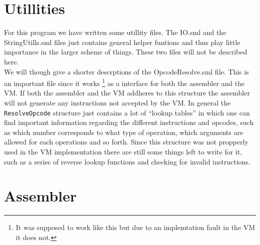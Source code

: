 \documentclass{article}
\newcommand{\V}{\verb}
\begin{document}
\section{Utillities}
For this program we have written some utillity files. The IO.sml and the
StringUtills.sml files just contains general helper funtions and thus play
little importance in the larger scheme of things. These two files will not be
described here.
\\
We will though give a shorter descrptions of the OpcodeResolve.sml file. This is
an important file since it works \footnote{It was supposed to work like this
but due to an implemtation fault in the VM it does not.} as a interface for both
the assembler and the VM. If both the assembler and the VM addheres to this
structure the assembler will not generate any instructions not accepted by the
VM. In general the \V+ResolveOpcode+ structure just contains a lot of ``lookup
tables'' in which one can find important information regarding the different
instructions and opcodes, such as which number corresponds to what type of operation, which 
arguments are allowed for each operations and so forth.
Since this structure was not propperly used in the VM implementation there are
still some things left to write for it, such as a series of reverse lookup
functions and checking for invalid instructions.

\section{Assembler}
\end{document}
